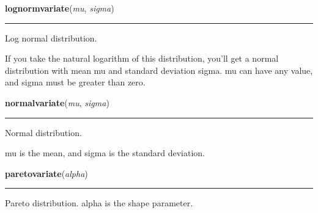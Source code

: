     \label{random:lognormvariate}

    \vspace{0.5ex}

\hspace{.8\funcindent}\begin{boxedminipage}{\funcwidth}

    \raggedright \textbf{lognormvariate}(\textit{mu}, \textit{sigma})

    \vspace{-1.5ex}

    \rule{\textwidth}{0.5\fboxrule}
\setlength{\parskip}{2ex}
    Log normal distribution.

    If you take the natural logarithm of this distribution, you'll get a 
    normal distribution with mean mu and standard deviation sigma. mu can 
    have any value, and sigma must be greater than zero.

\setlength{\parskip}{1ex}
    \end{boxedminipage}

    \label{random:normalvariate}

    \vspace{0.5ex}

\hspace{.8\funcindent}\begin{boxedminipage}{\funcwidth}

    \raggedright \textbf{normalvariate}(\textit{mu}, \textit{sigma})

    \vspace{-1.5ex}

    \rule{\textwidth}{0.5\fboxrule}
\setlength{\parskip}{2ex}
    Normal distribution.

    mu is the mean, and sigma is the standard deviation.

\setlength{\parskip}{1ex}
    \end{boxedminipage}

    \label{random:paretovariate}

    \vspace{0.5ex}

\hspace{.8\funcindent}\begin{boxedminipage}{\funcwidth}

    \raggedright \textbf{paretovariate}(\textit{alpha})

    \vspace{-1.5ex}

    \rule{\textwidth}{0.5\fboxrule}
\setlength{\parskip}{2ex}
    Pareto distribution.  alpha is the shape parameter.

\setlength{\parskip}{1ex}
    \end{boxedminipage}

